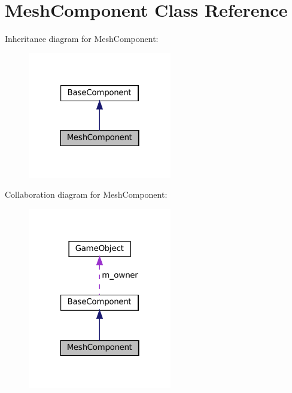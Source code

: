 \hypertarget{classMeshComponent}{}\section{Mesh\+Component Class Reference}
\label{classMeshComponent}


Inheritance diagram for Mesh\+Component\+:
\nopagebreak
\begin{figure}[H]
\begin{center}
\leavevmode
\includegraphics[width=178pt]{classMeshComponent__inherit__graph}
\end{center}
\end{figure}


Collaboration diagram for Mesh\+Component\+:
\nopagebreak
\begin{figure}[H]
\begin{center}
\leavevmode
\includegraphics[width=178pt]{classMeshComponent__coll__graph}
\end{center}
\end{figure}
